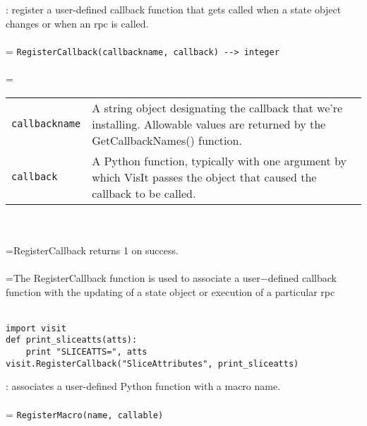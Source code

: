 \documentclass[10pt,a4paper]{report}
\begin{document}
{}
: register a user-defined callback function that gets called when a state object changes or when an rpc is called.\\[-3mm]

 \\ 
\hangindent=\parindent 
\verb!RegisterCallback(callbackname, callback) --> integer!\\ [-3mm]

 \\ 
\hangindent=\parindent 
\begin{tabular}{lp{9cm}}
\verb!callbackname! & A string object designating the callback that we're installing. Allowable values are returned by the GetCallbackNames() function. \\
\verb!callback! & A Python function, typically with one argument by which VisIt passes the object that caused the callback to be called. \\
\end{tabular} \\[-2mm]


 \\ 
\hangindent=\parindent RegisterCallback returns 1 on success. \\[-3mm] 

 \\ 
\hangindent=\parindent The RegisterCallback function is used to associate a user$-$defined callback function with the updating of a state object or execution of a particular rpc \\[-3mm] 

\\[-6mm]
\begin{verbatim}import visit
def print_sliceatts(atts):
    print "SLICEATTS=", atts
visit.RegisterCallback("SliceAttributes", print_sliceatts)
\end{verbatim}
\newpage


{}
: associates a user-defined Python function with a macro name.\\[-3mm]

 \\ 
\hangindent=\parindent 
\verb!RegisterMacro(name, callable)!\\ [-3mm]
\end{document}
